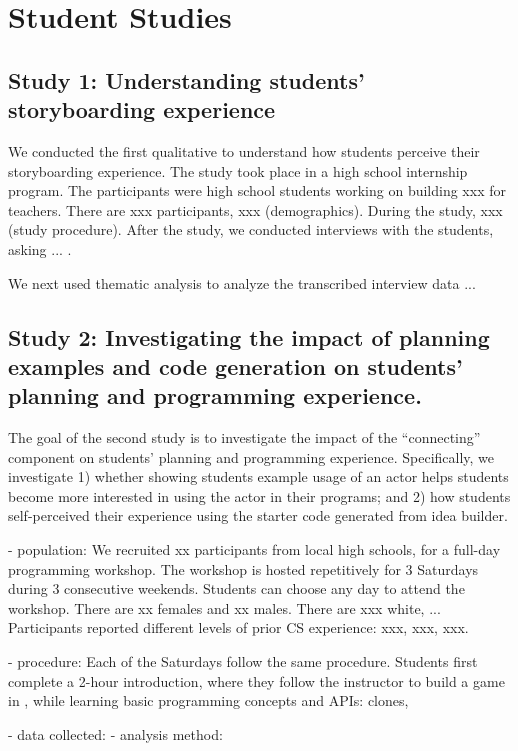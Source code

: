 \section{Student Studies}

\subsection{Study 1: Understanding students' storyboarding experience}

We conducted the first qualitative to understand how students perceive their storyboarding experience. The study took place in a high school internship program. The participants were high school students working on building xxx for teachers. There are xxx participants, xxx (demographics). During the study, xxx (study procedure). After the study, we conducted interviews with the students, asking ... .

We next used thematic analysis to analyze the transcribed interview data ... 


\subsection{Study 2: Investigating the impact of planning examples and code generation on students' planning and programming experience.}


The goal of the second study is to investigate the impact of the ``connecting'' component on students' planning and programming experience. Specifically, we investigate
1) whether showing students example usage of an actor helps students become more interested in using the actor in their programs; 
and 2) how students self-perceived their experience using the starter code generated from idea builder. 

- population: We recruited xx participants from local high schools, for a full-day programming workshop. The workshop is hosted repetitively for 3 Saturdays during 3 consecutive weekends. Students can choose any day to attend the workshop. 
There are xx females and xx males.
There are xxx white, ...
Participants reported different levels of prior CS experience: xxx, xxx, xxx.

- procedure: Each of the Saturdays follow the same procedure. Students first complete a 2-hour \snap introduction, where they follow the instructor to build a game in \snap, while learning basic programming concepts and \snap APIs: clones, 


- data collected:
- analysis method:

